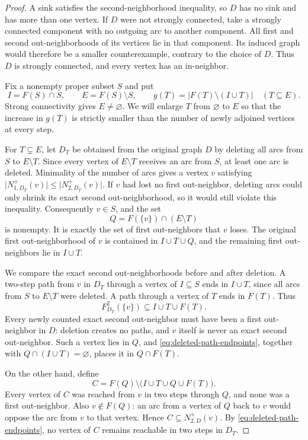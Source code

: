 \documentclass[11pt]{article}
\theoremstyle{remark}
\newcommand{\abs}[1]{\lvert #1\rvert}
\begin{document}
\begin{proof}
A sink satisfies the second-neighborhood inequality, so $D$ has no sink
and has more than one vertex.  If $D$ were not strongly connected, take
a strongly connected component with no outgoing arc to another component.
All first and second out-neighborhoods of its vertices lie in that
component.  Its induced graph would therefore be a smaller counterexample,
contrary to the choice of $D$.  Thus $D$ is strongly connected, and every
vertex has an in-neighbor.

Fix a nonempty proper subset $S$ and put
\[
  I=F(S)\cap S,\qquad E=F(S)\setminus S,
  \qquad g(T)=\abs{F(T)\setminus(I\cup T)}\quad(T\subseteq E).
\]
Strong connectivity gives $E\ne\varnothing$.  We will enlarge $T$ from
$\varnothing$ to $E$ so that the increase in $g(T)$ is strictly smaller
than the number of newly adjoined vertices at every step.

For $T\subsetneq E$, let $D_T$ be obtained from the original graph $D$
by deleting all arcs from $S$ to $E\setminus T$.  Since every vertex of
$E\setminus T$ receives an arc from $S$, at least one arc is deleted.
Minimality of the number of arcs gives a vertex $v$ satisfying
$\abs{N_{1,D_T}^+(v)}\le\abs{N_{2,D_T}^+(v)}$.
If $v$ had lost no first out-neighbor, deleting arcs could only shrink
its exact second out-neighborhood, so it would still violate this
inequality.  Consequently $v\in S$, and the set
\[
  Q=F(\{v\})\cap(E\setminus T)
\]
is nonempty.  It is exactly the set of first out-neighbors that $v$ loses.
The original first out-neighborhood of $v$ is contained in $I\cup T\cup Q$,
and the remaining first out-neighbors lie in $I\cup T$.

We compare the exact second out-neighborhoods before and after deletion.
A two-step path from $v$ in $D_T$ through a vertex of $I\subseteq S$
ends in $I\cup T$, since all arcs from $S$ to $E\setminus T$ were
deleted.  A path through a vertex of $T$ ends in $F(T)$.  Thus
\begin{equation}
\label{eq:deleted-path-endpoints}
  F_{D_T}^2(\{v\})\subseteq I\cup T\cup F(T).
\end{equation}
Every newly counted exact second out-neighbor must have been a first
out-neighbor in $D$: deletion creates no paths, and $v$ itself is never
an exact second out-neighbor.  Such a vertex lies in $Q$, and
\eqref{eq:deleted-path-endpoints}, together with
$Q\cap(I\cup T)=\varnothing$, places it in $Q\cap F(T)$.

On the other hand, define
\[
  C=F(Q)\setminus\bigl(I\cup T\cup Q\cup F(T)\bigr).
\]
Every vertex of $C$ was reached from $v$ in two steps through $Q$, and
none was a first out-neighbor.  Also $v\notin F(Q)$: an arc from a
vertex of $Q$ back to $v$ would oppose the arc from $v$ to that vertex.
Hence $C\subseteq N_{2,D}^+(v)$.  By
\eqref{eq:deleted-path-endpoints}, no vertex of $C$ remains reachable
in two steps in $D_T$.


\end{proof}
\end{document}

